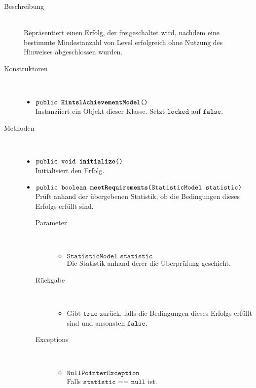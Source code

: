 \begin{description}
\item[Beschreibung] \hfill \\ Repräsentiert einen Erfolg, der freigeschaltet wird, nachdem eine bestimmte Mindestanzahl von Level erfolgreich ohne Nutzung des Hinweises abgeschlossen wurden.
	
\item[Konstruktoren] \hfill \\
	\vspace{-.8cm}
	\begin{itemize}
		\item $\texttt{public \textbf{HintslAchievementModel}()}$ \\ Instanziiert ein Objekt dieser Klasse. Setzt $\texttt{locked}$ auf $\texttt{false}$.
	\end{itemize}
	
\item[Methoden] \hfill \\
	\vspace{-.8cm}
	\begin{itemize}
		\item $\texttt{public void \textbf{initialize}()}$ \\ Initialisiert den Erfolg.
		
		\item $\texttt{public boolean \textbf{meetRequirements}(StatisticModel statistic)}$ \\ Prüft anhand der übergebenen Statistik, ob die Bedingungen dieses Erfolgs erfüllt sind.
		\begin{description}
		\item[Parameter] \hfill \\
			\vspace{-.8cm}
			\begin{itemize}
				\item $\texttt{StatisticModel statistic}$ \\ Die Statistik anhand derer die Überprüfung geschieht. 
			\end{itemize}
			\item[Rückgabe] \hfill \\
			\vspace{-.8cm}
			\begin{itemize}
				\item Gibt $\texttt{true}$ zurück, falls die Bedingungen dieses Erfolgs erfüllt sind und ansonsten $\texttt{false}$.
			\end{itemize}
			\item[Exceptions] \hfill \\
			\vspace{-.8cm}
			\begin{itemize}
				\item $\texttt{NullPointerException}$ \\ Falls $\texttt{statistic == null}$ ist.
			\end{itemize}
		\end{description}
		
	\end{itemize}
\end{description}

